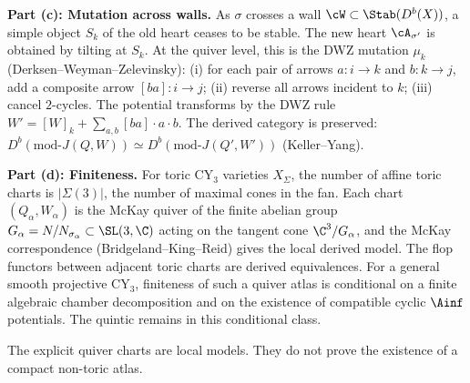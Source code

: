 \begin{conjecture}
\medskip
\noindent\textbf{Part (c): Mutation across walls.} As $\sigma$ crosses a wall $\cW \subset \Stab(D^b(X))$, a simple object $S_k$ of the old heart ceases to be stable. The new heart $\cA_{\sigma'}$ is obtained by tilting at $S_k$. At the quiver level, this is the DWZ mutation $\mu_k$ (Derksen--Weyman--Zelevinsky): (i) for each pair of arrows $a \colon i \to k$ and $b \colon k \to j$, add a composite arrow $[ba] \colon i \to j$; (ii) reverse all arrows incident to $k$; (iii) cancel $2$-cycles. The potential transforms by the DWZ rule $W' = [W]_k + \sum_{a,b} [ba] \cdot a \cdot b$. The derived category is preserved: $D^b(\mathrm{mod}\text{-}J(Q, W)) \simeq D^b(\mathrm{mod}\text{-}J(Q', W'))$ (Keller--Yang).

\medskip
\noindent\textbf{Part (d): Finiteness.} For toric CY$_3$ varieties
$X_\Sigma$, the number of affine toric charts is $|\Sigma(3)|$, the
number of maximal cones in the fan. Each chart
$(Q_\alpha,W_\alpha)$ is the McKay quiver of the finite abelian group
$G_\alpha=N/N_{\sigma_\alpha}\subset \SL(3,\C)$ acting on the tangent
cone $\C^3/G_\alpha$, and the McKay correspondence
(Bridgeland--King--Reid) gives the local derived model. The flop
functors between adjacent toric charts are derived equivalences. For a
general smooth projective CY$_3$, finiteness of such a quiver atlas is
conditional on a finite algebraic chamber decomposition and on the
existence of compatible cyclic $\Ainf$ potentials. The quintic remains
in this conditional class.

\medskip
The explicit quiver charts are local models. They do not prove the
existence of a compact non-toric atlas.
\end{conjecture}

